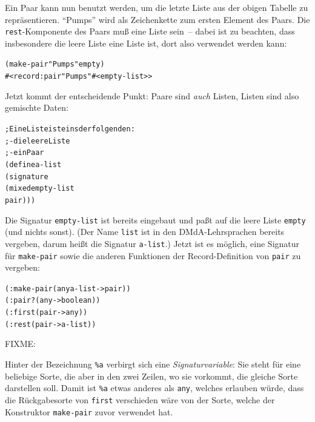 Ein Paar kann nun benutzt werden, um die letzte Liste aus der obigen
Tabelle zu repräsentieren.  "`Pumps"' wird als Zeichenkette zum ersten
Element des Paars.  Die \texttt{rest}-Komponente des Paars muß eine
Liste sein~-- dabei ist zu beachten, dass insbesondere die leere Liste
eine Liste ist, dort also verwendet werden kann:
%
\begin{alltt}
(make-pair "Pumps" empty)
\evalsto{} #<record:pair "Pumps" #<empty-list>>
\end{alltt}
%
Jetzt kommt der entscheidende Punkt: Paare sind \emph{auch} Listen,
Listen sind also gemischte Daten:\label{def:a-list}
%
\begin{alltt}
; Eine Liste ist eins der folgenden:
; - die leere Liste
; - ein Paar
(define a-list
  (signature
   (mixed empty-list
          pair)))
\end{alltt}
%
Die Signatur \texttt{empty-list} ist bereits eingebaut und paßt auf
die leere Liste \texttt{empty} (und nichts sonst).  (Der Name
\texttt{list} ist in den DMdA-Lehrsprachen bereits vergeben, darum
heißt die Signatur \texttt{a-list}.)  Jetzt ist es möglich, eine
Signatur für \texttt{make-pair} sowie die anderen Funktionen der
Record-Definition von \texttt{pair} zu vergeben:
%
\begin{alltt}
(: make-pair (any a-list -> pair))
(: pair? (any -> boolean))
(: first (pair -> any))
(: rest (pair -> a-list))
\end{alltt}
%
FIXME:

Hinter der Bezeichnung \verb$%a$ verbirgt sich eine 
\emph{Signaturvariable}: Sie
steht für eine beliebige Sorte, die aber in den zwei Zeilen, wo sie vorkommt,
die gleiche Sorte darstellen soll.  Damit ist \verb$%a$ etwas anderes als
\texttt{any}, welches erlauben würde, dass die Rückgabesorte von \texttt{first}
verschieden wäre von der Sorte, welche der Konstruktor \texttt{make-pair} zuvor
verwendet hat.

